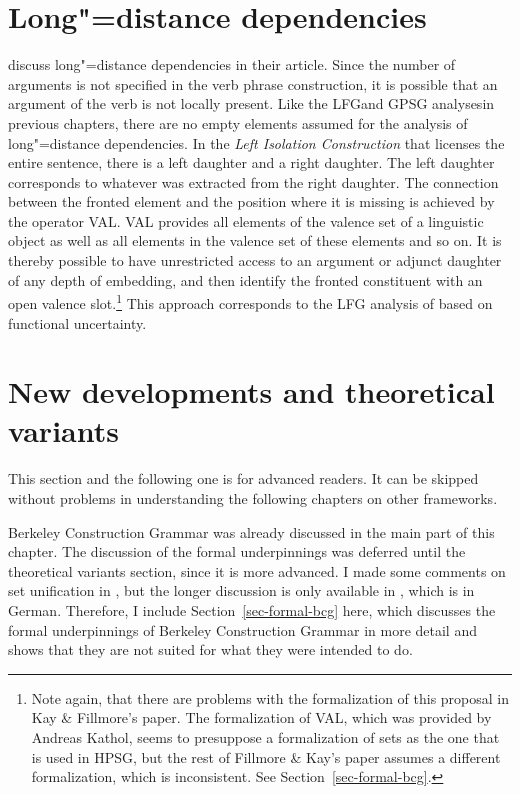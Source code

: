 \section{Long"=distance dependencies}

\mbox{}\citet[Section~3.10]{KF99a} discuss long"=distance dependencies in their article.
Since the number of arguments is not specified in the verb phrase construction, it is possible that an argument of the verb is not locally
present. Like the LFG\indexlfg and GPSG analyses\indexgpsg in previous chapters, there are no empty elements assumed
for the analysis of long"=distance dependencies.
 In the \emph{Left Isolation Construction} that licenses the entire sentence, there is a left daughter and a right daughter.
 The left daughter corresponds to whatever was extracted from the right daughter. The connection between the fronted element
 and the position where it is missing is achieved by the operator VAL.
 VAL provides all elements of the valence set of a linguistic object as well as all elements in the valence set of these elements and so on.
 It is thereby possible to have unrestricted access to an argument or adjunct daughter of any depth of embedding, and then identify the fronted
 constituent with an open valence slot.\footnote{%
   Note again, that there are problems with the formalization of this proposal in Kay \& Fillmore's
   paper. The formalization of VAL, which was provided by Andreas Kathol, seems to presuppose a
   formalization of sets as the one that is used in HPSG, but the rest of Fillmore \& Kay's paper
   assumes a different formalization, which is inconsistent. See Section~\ref{sec-formal-bcg}.
 } This approach corresponds to the LFG analysis of \citet{KZ89a} based on functional uncertainty.%

\section{New developments and theoretical variants}

This section and the following one is for advanced readers. It can be skipped without problems in
understanding the following chapters on other frameworks.

Berkeley Construction Grammar was already discussed in the main part of this chapter. The discussion
of the formal underpinnings was deferred until the theoretical variants section, since it is more
advanced. I made some comments on set unification in , but the longer
discussion is only available in , which is in
German. Therefore, I include Section~\ref{sec-formal-bcg} here, which discusses the formal
underpinnings of Berkeley Construction Grammar in more detail and shows that they are not suited for what they were intended to do.


